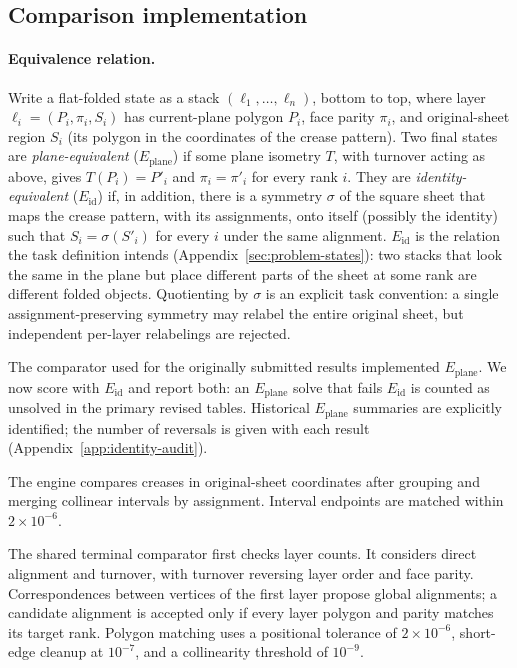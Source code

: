 \subsection{Comparison implementation}
\label{app:comparison-details}

\paragraph{Equivalence relation.} Write a flat-folded state as a stack $(\ell_1,\dots,\ell_n)$,
bottom to top, where layer $\ell_i=(P_i,\pi_i,S_i)$ has current-plane polygon $P_i$, face parity
$\pi_i$, and original-sheet region $S_i$ (its polygon in the coordinates of the crease pattern).
Two final states are \emph{plane-equivalent} ($E_{\mathrm{plane}}$) if some plane isometry $T$,
with turnover acting as above, gives $T(P_i)=P'_i$ and $\pi_i=\pi'_i$ for every rank $i$.
They are \emph{identity-equivalent} ($E_{\mathrm{id}}$) if, in addition, there is a symmetry
$\sigma$ of the square sheet that maps the crease pattern, with its assignments, onto itself
(possibly the identity) such that $S_i=\sigma(S'_i)$ for every $i$ under the same alignment.
$E_{\mathrm{id}}$ is the relation the task definition intends (Appendix~\ref{sec:problem-states}):
two stacks that look the same in the plane but place different parts of the sheet at some rank
are different folded objects. Quotienting by $\sigma$ is an explicit task convention: a single assignment-preserving
symmetry may relabel the entire original sheet, but independent per-layer relabelings are rejected.

The comparator used for the originally submitted results implemented $E_{\mathrm{plane}}$. We now
score with $E_{\mathrm{id}}$ and report both: an $E_{\mathrm{plane}}$ solve that fails
$E_{\mathrm{id}}$ is counted as unsolved in the primary revised tables. Historical
$E_{\mathrm{plane}}$ summaries are explicitly identified; the number of reversals is
given with each result (Appendix~\ref{app:identity-audit}).

The engine compares creases in original-sheet coordinates after grouping and merging collinear
intervals by assignment. Interval endpoints are matched within $2\times10^{-6}$.

The shared terminal comparator first checks layer counts. It considers direct alignment and
turnover, with turnover reversing layer order and face parity. Correspondences between vertices
of the first layer propose global alignments; a candidate alignment is accepted only if every
layer polygon and parity matches its target rank. Polygon matching uses a positional tolerance
of $2\times10^{-6}$, short-edge cleanup at $10^{-7}$, and a collinearity threshold of $10^{-9}$.


